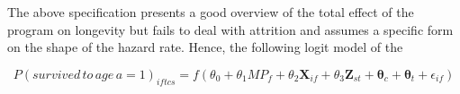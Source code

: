 The above specification presents a good overview of the total effect of the program on longevity but fails to deal with attrition and assumes a specific form on the shape of the hazard rate. Hence, the following logit model of the 

$$
P(survived\,to\,age\,a=1)_{iftcs} = f(\theta_0 + \theta_1MP_f + \theta_2\mathbf{X}_{if} + \theta_3\mathbf{Z}_{st} + \mathbf{\theta}_c + \mathbf{\theta}_t + \epsilon_{if})
$$